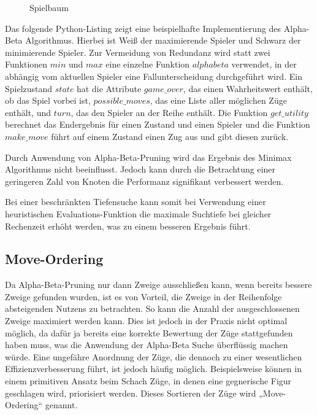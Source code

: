 \begin{figure}
    \centering
    \caption{Spielbaum}
    \label{fig:game_tree_ab_pruning}
\end{figure}

Das folgende Python-Listing zeigt eine beispielhafte Implementierung des Alpha-Beta Algorithmus. Hierbei ist Weiß der
maximierende Spieler und Schwarz der minimierende Spieler. Zur Vermeidung von Redundanz wird statt zwei Funktionen $min$
und $max$ eine einzelne Funktion $alphabeta$ verwendet, in der abhängig vom aktuellen Spieler eine Fallunterscheidung
durchgeführt wird. Ein Spielzustand $state$ hat die Attribute $game\_over$, das einen Wahrheitswert enthält, ob das
Spiel vorbei ist, $possible\_moves$, das eine Liste aller möglichen Züge enthält, und $turn$, das den Spieler an der
Reihe enthält. Die Funktion $get\_utility$ berechnet das Endergebnis für einen Zustand und einen Spieler und die
Funktion $make\_move$ führt auf einem Zustand einen Zug aus und gibt diesen zurück.



Durch Anwendung von Alpha-Beta-Pruning wird das Ergebnis des Minimax Algorithmus nicht beeinflusst. Jedoch kann durch
die Betrachtung einer geringeren Zahl von Knoten die Performanz signifikant verbessert werden.
\cite[S.~167]{ai2010russel}

Bei einer beschränkten Tiefensuche kann somit bei Verwendung einer heuristischen Evaluations-Funktion die maximale
Suchtiefe bei gleicher Rechenzeit erhöht werden, was zu einem besseren Ergebnis führt.

\subsection{Move-Ordering}
Da Alpha-Beta-Pruning nur dann Zweige ausschließen kann, wenn bereits bessere Zweige gefunden wurden, ist es von
Vorteil, die Zweige in der Reihenfolge absteigenden Nutzens zu betrachten. So kann die Anzahl der ausgeschlossenen
Zweige maximiert werden kann. Dies ist jedoch in der Praxis nicht optimal möglich, da dafür ja bereits eine korrekte
Bewertung der Züge stattgefunden haben muss, was die Anwendung der Alpha-Beta Suche überflüssig machen würde. Eine
ungefähre Anordnung der Züge, die dennoch zu einer wesentlichen Effizienzverbesserung führt, ist jedoch häufig möglich.
Beispielsweise können in einem primitiven Ansatz beim Schach Züge, in denen eine gegnerische Figur geschlagen wird,
priorisiert werden. Dieses Sortieren der Züge wird „Move-Ordering“ genannt.
\cite[S.~169]{ai2010russel}

